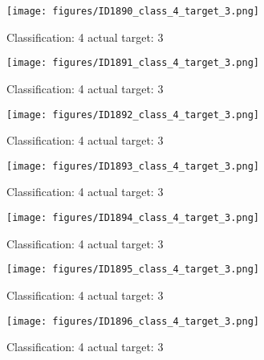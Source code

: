\begin{figure}[h!]
\begin{center}
\texttt{[image: figures/ID1890\_class\_4\_target\_3.png]}
\end{center}
\caption{ Classification: 4 actual target: 3}
\label{fig:ID1890_class_4_target_3}
\end{figure}
\begin{figure}[h!]
\begin{center}
\texttt{[image: figures/ID1891\_class\_4\_target\_3.png]}
\end{center}
\caption{ Classification: 4 actual target: 3}
\label{fig:ID1891_class_4_target_3}
\end{figure}
\begin{figure}[h!]
\begin{center}
\texttt{[image: figures/ID1892\_class\_4\_target\_3.png]}
\end{center}
\caption{ Classification: 4 actual target: 3}
\label{fig:ID1892_class_4_target_3}
\end{figure}
\begin{figure}[h!]
\begin{center}
\texttt{[image: figures/ID1893\_class\_4\_target\_3.png]}
\end{center}
\caption{ Classification: 4 actual target: 3}
\label{fig:ID1893_class_4_target_3}
\end{figure}
\begin{figure}[h!]
\begin{center}
\texttt{[image: figures/ID1894\_class\_4\_target\_3.png]}
\end{center}
\caption{ Classification: 4 actual target: 3}
\label{fig:ID1894_class_4_target_3}
\end{figure}
\begin{figure}[h!]
\begin{center}
\texttt{[image: figures/ID1895\_class\_4\_target\_3.png]}
\end{center}
\caption{ Classification: 4 actual target: 3}
\label{fig:ID1895_class_4_target_3}
\end{figure}
\begin{figure}[h!]
\begin{center}
\texttt{[image: figures/ID1896\_class\_4\_target\_3.png]}
\end{center}
\caption{ Classification: 4 actual target: 3}
\label{fig:ID1896_class_4_target_3}
\end{figure}
